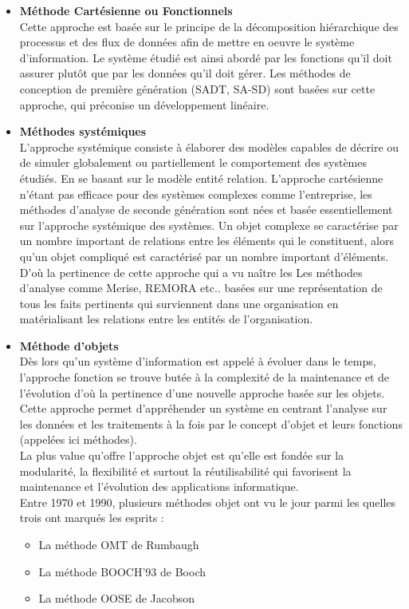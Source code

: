 \documentclass[a4paper, 12pt]{report}
\begin{document}
\begin{itemize}
  \item \textbf{Méthode Cartésienne ou Fonctionnels} \\ 
  Cette approche est basée sur le principe de la décomposition hiérarchique des processus et des flux de données afin de mettre en oeuvre le système d'information. Le système étudié est ainsi abordé par les fonctions qu'il doit assurer plutôt que par les données qu'il doit gérer. Les méthodes de conception de première génération (SADT, SA-SD) sont basées sur cette approche, qui préconise un développement linéaire.
  \item \textbf{Méthodes systémiques} \\
  L'approche systémique consiste à élaborer des modèles capables de décrire ou de simuler globalement ou partiellement le comportement des systèmes étudiés. En se basant sur le modèle entité relation. L'approche cartésienne n'étant pas efficace pour des systèmes complexes comme l'entreprise, les méthodes d'analyse de seconde génération sont nées et basée essentiellement sur l'approche systémique des systèmes. Un objet complexe se caractérise par un nombre important de relations entre les éléments qui le constituent, alors qu'un objet compliqué est caractérisé par un nombre important d'éléments. D'où la pertinence de cette approche qui a vu naître les Les méthodes d'analyse comme Merise, REMORA etc.. basées sur une représentation de tous les faits pertinents qui surviennent dans une organisation en matérialisant les relations entre les entités de l'organisation.
  \item \textbf{Méthode d’objets} \\
  Dès lors qu'un système d'information est appelé à évoluer dans le temps, l'approche fonction se trouve butée à la complexité de la maintenance et de l'évolution d'où la pertinence d'une nouvelle approche basée sur les objets. Cette approche permet d'appréhender un système en centrant l'analyse sur les données et les traitements à la fois par le concept d'objet et leurs fonctions (appelées ici méthodes). \\
  La plus value qu'offre l'approche objet est qu'elle est fondée sur la modularité, la flexibilité et surtout la réutilisabilité qui favorisent la maintenance et l'évolution des applications informatique.\\
  Entre 1970 et 1990, plusieurs méthodes objet ont vu le jour parmi les quelles trois ont marqués les esprits : \\
  \begin{itemize}
    \item La méthode OMT de Rumbaugh
    \item La méthode BOOCH'93 de Booch
    \item La méthode OOSE de Jacobson
  \end{itemize}
\end{itemize}
\end{document}

